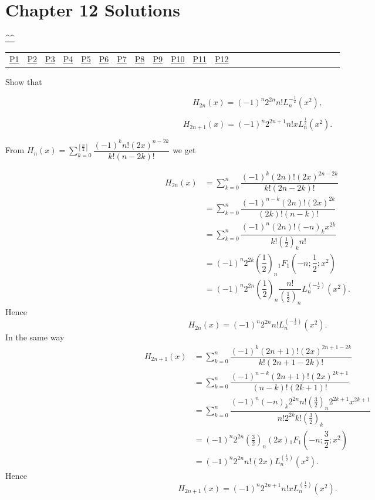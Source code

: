 \section{Chapter 12 Solutions}
\begin{center}\hyperref[toc]{\^{}\^{}}\end{center}
\begin{center}\begin{tabular}{lllllllllllllllllllllllll}
\hyperref[problem1chapter12]{P1} & \hyperref[problem2chapter12]{P2} & \hyperref[problem3chapter12]{P3} & \hyperref[problem4chapter12]{P4} & \hyperref[problem5chapter12]{P5} & \hyperref[problem6chapter12]{P6} & \hyperref[problem7chapter12]{P7} & \hyperref[problem8chapter12]{P8} & \hyperref[problem9chapter12]{P9} & \hyperref[problem10chapter12]{P10} & \hyperref[problem11chapter12]{P11} & \hyperref[problem12chapter12]{P12}
\end{tabular}\end{center}
\setcounter{problem}{0}
\setcounter{solution}{0}
\begin{problem}\label{problem1chapter12}
Show that

$$H_{2n}(x) = (-1)^n 2^{2n} n! L_n^{-\frac{1}{2}}(x^2),$$

$$H_{2n+1}(x) = (-1)^n 2^{2n+1} n! x L_n^{\frac{1}{2}}(x^2).$$
\end{problem}
\begin{solution}
From $H_n(x) = \displaystyle\sum_{k=0}^{[\frac{n}{2}]} \dfrac{(-1)^k n! (2x)^{n-2k}}{k! (n-2k)!}$ we get

$$\begin{array}{ll}
H_{2n}(x) &= \displaystyle\sum_{k=0}^n \dfrac{(-1)^k (2n)! (2x)^{2n-2k}}{k! (2n-2k)!} \\
&= \displaystyle\sum_{k=0}^n \dfrac{(-1)^{n-k} (2n)! (2x)^{2k}}{(2k)! (n-k)!} \\
&= \displaystyle\sum_{k=0}^n \dfrac{(-1)^n (2n)! (-n)_k x^{2k}}{k! (\frac{1}{2})_k n!} \\
&= (-1)^n 2^{2k} \left( \dfrac{1}{2} \right)_n {}_1F_1 \left(-n; \dfrac{1}{2}; x^2 \right) \\
&= (-1)^n 2^{2n} \left( \dfrac{1}{2} \right)_n \dfrac{n!}{(\frac{1}{2})_n} L_n^{(-\frac{1}{2})}(x^2).
\end{array}$$
Hence
$$H_{2n}(x) = (-1)^n 2^{2n}n! L_n^{(-\frac{1}{2})}(x^2).$$
In the same way
$$\begin{array}{ll}
H_{2n+1}(x) &= \displaystyle\sum_{k=0}^n \dfrac{(-1)^k (2n+1)! (2x)^{2n+1-2k}}{k! (2n+1-2k)!} \\
&= \displaystyle\sum_{k=0}^n \dfrac{(-1)^{n-k} (2n+1)! (2x)^{2k+1}}{(n-k)! (2k+1)!} \\
&= \displaystyle\sum_{k=0}^n \dfrac{(-1)^n (-n)_k 2^{2n} n! ( \frac{3}{2})_n 2^{2k+1} x^{2k+1}}{n! 2^{2k} k! (\frac{3}{2})_k} \\
&= (-1)^n 2^{2n} (\frac{3}{2})_n (2x) {}_1F_1 \left(-n; \dfrac{3}{2};x^2 \right) \\
&= (-1)^n 2^{2n} n! (2x) L_n^{(\frac{1}{2})}(x^2).
\end{array}$$
Hence
$$H_{2n+1}(x) = (-1)^n 2^{2n+1} n! x L_n^{(\frac{1}{2})}(x^2).$$
\end{solution}

